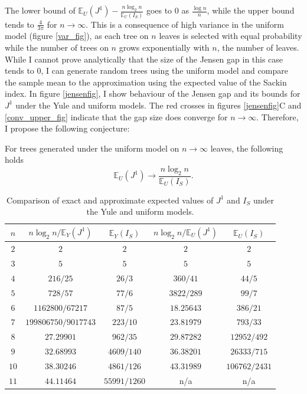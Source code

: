 The lower bound of $\mathbb{E}_U(J^1)-\frac{n\log_2n}{\mathbb{E}_U(I_S)}$ goes
to $0$ as $\frac{\log n}{n}$, while the upper bound tends to $\frac{4}{3\pi}$
for $n\to\infty$. This is a consequence of high variance in the uniform model
(figure \ref{var_fig}), as each tree on $n$ leaves is selected with equal
probability while the number of trees on $n$ grows exponentially with $n$,
the number of leaves. While I cannot prove analytically that the size of the
Jensen gap in this case tends to $0$, I can generate random trees using the
uniform model and compare the sample mean to the approximation using the
expected value of the Sackin index. In figure \ref{jensenfig}, I show behaviour
of the Jensen gap and its bounds for $J^1$ under the Yule and uniform models.
The red crosses in figures \ref{jensenfig}C and \ref{conv_upper_fig} indicate
that the gap size does converge for $n\to\infty$. Therefore, I propose the
following conjecture:

\begin{conjecture}
    For trees generated under the uniform model on $n\to\infty$ leaves, the
    following holds
    \begin{equation}
        \mathbb{E}_U(J^1) \to \frac{n\log_2n}{\mathbb{E}_U(I_S)}.
        \label{conjecture1}
    \end{equation}
\end{conjecture}

\begin{table}[h]
    \centering
    \begin{tabular}{|c|c|c|c|c|}
        \hline
        $n$ & $n\log_2n/\mathbb{E}_Y(J^1)$ & $\mathbb{E}_Y(I_S)$ & $n\log_2n/
        \mathbb{E}_U(J^1)$ & $\mathbb{E}_U(I_S)$\\
        \hline
        $2$ & $2$ & $2$  & $2$ & $2$ \\
        \hline
        $3$ & $5$ & $5$  & $5$ & $5$ \\
        \hline
        $4$ & $216/25$ & $26/3$ & $360/41$ & $44/5$ \\
        \hline
        $5$ & $728/57$ & $77/6$ & $3822/289$ & $99/7$ \\
        \hline
        $6$ & $1162800/67217$ & $87/5$ & $18.25643$ & $386/21$ \\
        \hline
        $7$ & $199806750/9017743$ & $223/10$ & $23.81979$ & $793/33$ \\
        \hline
        $8$ & $27.29901$ & $962/35$& $29.87282$ & $12952/492$\\
        \hline
        $9$ & $32.68993$ & $4609/140$ & $36.38201$ & $26333/715$ \\
        \hline
        $10$ & $38.30246$ & $4861/126$ & $43.31989$ & $106762/2431$ \\
        \hline
        $11$ & $44.11464$ & $55991/1260$ & n/a & n/a \\
        \hline
    \end{tabular}
    \caption{Comparison of exact and approximate expected values of $J^1$ and
    $I_S$ under the Yule and uniform models.}
    \label{table_values}
\end{table}

